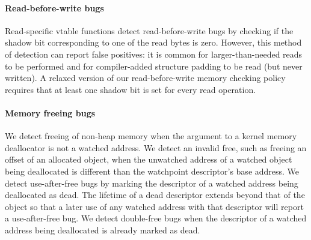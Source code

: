 \documentclass[letterpaper,twocolumn,10pt]{article}
\begin{document}




\paragraph{Read-before-write bugs}
Read-specific vtable functions detect read-before-write bugs by checking if the shadow bit corresponding to one of the read bytes is zero. However, this method of detection can report false positives: it is common for larger-than-needed reads to be performed and for compiler-added structure padding to be read (but never written). A relaxed version of our read-before-write memory checking policy requires that at least one shadow bit is set for every read operation.

\paragraph{Memory freeing bugs}
We detect freeing of non-heap memory when the argument to a kernel memory deallocator is not a watched address. We detect an invalid free, such as freeing an offset of an allocated object, when the unwatched address of a watched object being deallocated is different than the watchpoint descriptor's base address. We detect use-after-free bugs by marking the descriptor of a watched address being deallocated as dead. The lifetime of a dead descriptor extends beyond that of the object so that a later use of any watched address with that descriptor will report a use-after-free bug. We detect double-free bugs when the descriptor of a watched address being deallocated is already marked as dead.

\end{document}
